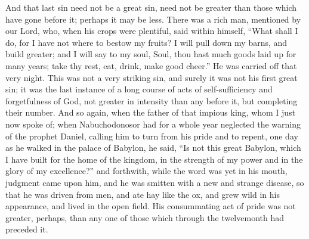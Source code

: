 And that last sin need not be a great sin, need not be greater than
those which have gone before it; perhaps it may be less. There was a
rich man, mentioned by our Lord, who, when his crops were plentiful,
said within himself, ``What shall I do, for I have not where to
bestow my fruits? I will pull down my barns, and build greater; and I
will say to my soul, Soul, thou hast much goods laid up for many
years; take thy rest, eat, drink, make good cheer.'' He was
carried off that very night. This was not a very striking sin, and
surely it was not his first great sin; it was the last instance of a
long course of acts of self-sufficiency and forgetfulness of God, not
greater in intensity than any before it, but completing their number.
And so again, when the father of that impious king, whom I just now
spoke of; when Nabuchodonosor had for a whole year neglected the
warning of the prophet Daniel, calling him to turn from his pride and
to repent, one day as he walked in the palace of Babylon, he said,
``Is not this great Babylon, which I have built for the home of
the kingdom, in the strength of my power and in the glory of my
excellence?'' and forthwith, while the word was yet in his mouth,
judgment came upon him, and he was smitten with a new and strange
disease, so that he was driven from men, and ate hay like the ox, and
grew wild in his appearance, and lived in the open field. His
consummating act of pride was not greater, perhaps, than any one of
those which through the twelvemonth had preceded it.

